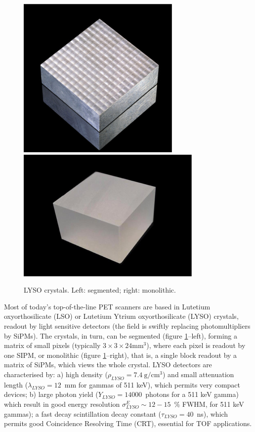 \begin{figure}[!htb]
	\centering
	\includegraphics[scale=0.5]{img/LysoSegmented.png}
	\includegraphics[scale=0.5]{img/LysoMono.png}
	\caption{\label{fig.lyso} LYSO crystals. Left: segmented; right: monolithic.  }
\end{figure}

Most of today's top-of-the-line PET scanners are based in  Lutetium oxyorthosilicate (LSO) or  
Lutetium Ytrium oxyorthosilicate (LYSO) crystals, readout by light sensitive detectors (the field is swiftly replacing photomultipliers by  SiPMs). The crystals, in turn, can be segmented (figure \ref{fig.lyso}--left), forming a matrix
of small pixels (typically $3\times 3 \times 24 \mathrm{mm^3}$), where each pixel is readout by one SIPM, or monolithic (figure \ref{fig.lyso}--right), that is, a single block readout by a matrix of SiPMs, which views the whole crystal. LYSO detectors
are characterised by: a) high density ($\rho_{LYSO} =7.4~\mathrm{g/cm^3}$) and small attenuation length 
($\lambda_{LYSO} =12$~mm for gammas of 511 keV), which permits very compact devices; b) large photon yield
($Y_{LYSO} =14000$~photons for a 511 keV gamma) which result in good energy resolution 
$\sigma^E_{LYSO} \sim12-15$~\% FWHM, for 511 keV gammas); a fast decay scintillation decay constant
($\tau_{LYSO} = 40$~ns), which permits good Coincidence Resolving Time (CRT), essential for TOF applications. 

